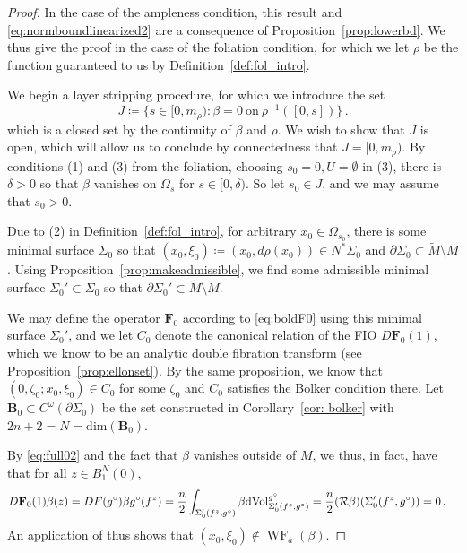 \documentclass[11pt]{amsart}
\DeclareMathOperator{\WF}{WF}
\theoremstyle{definition}
\numberwithin{equation}{section}
\newcommand{\p}{\partial}
\newcommand{\BB}{\mathbf B}
\begin{document}
\begin{proof}
In the case of the ampleness condition, this result and \eqref{eq:normboundlinearized2} are a consequence of Proposition~\ref{prop:lowerbd}. We thus give the proof in the case of the foliation condition, for which we let $\rho$ be the function guaranteed to us by Definition~\ref{def:fol_intro}. 

	We begin a layer stripping procedure, for which we introduce the set 
	\[
		J \coloneqq \{s\in [0,m_\rho)\colon \beta = 0\ \text{on}\ \rho^{-1}([0,s])\}\,.%
	\]
	which is a closed set by the continuity of $\beta$ and $\rho$. We wish to show that $J$ is open, which will allow us to conclude by connectedness that $J=[0,m_\rho)$. By conditions (1) and (3) from the foliation, choosing $s_0 = 0, U =\emptyset$ in (3), there is $\delta>0$ so that $\beta$ vanishes on $\Omega_s$ for $s\in [0,\delta)$. So let $s_0\in J$, and we may assume that $s_0>0$. 

	Due to (2) in Definition~\ref{def:fol_intro}, for arbitrary $x_0 \in \Omega_{s_0}$, there is some minimal surface $\Sigma_0$ so that $(x_0,\xi_0)\coloneqq (x_0,d\rho(x_0))\in N^\ast \Sigma_0$ and $\p\Sigma_0\subset \widetilde{M}\setminus M$. Using Proposition~\ref{prop:makeadmissible}, we find some admissible minimal surface $\Sigma_0'\subset \Sigma_0$ so that $\p\Sigma_0'\subset \widetilde{M}\setminus M$.
    
    We may define the operator $\mathbf{F}_0$ according to \eqref{eq:boldF0} using this minimal surface $\Sigma_0'$, and we let $C_0$ denote the canonical relation of the FIO $D\mathbf{F}_0(1)$, which we know to be an analytic double fibration transform (see Proposition~\ref{prop:ellonset}). By the same proposition, we know that $(0,\zeta_0;x_0,\xi_0)\in C_0$ for some $\zeta_0$ and $C_0$ satisfies the Bolker condition there. Let $\BB_0 \subset C^\omega(\partial\Sigma_0)$ be the set constructed in Corollary~\ref{cor: bolker} with $2n+2= N = \mathrm{dim}(\BB_0)$. %

    By \eqref{eq:full02} and the fact that $\beta$ vanishes outside of $M$, we thus, in fact, have that for all $z\in B_1^{N}(0)$,
	\begin{align*}
		D\mathbf{F}_0(1)\beta(z) &= DF(g^\circ)\beta g^\circ(f^z) = \frac{n}{2}\int_{\Sigma'_0(f^z,g^\circ)}\beta {\rm dVol}^{g^\circ}_{\Sigma'_0(f^z,g^\circ)} = \frac{n}{2}(\mathcal{R}\beta)(\Sigma_0'(f^z,g^\circ)) = 0\,.%
    	\end{align*}
    An application of \cite[Thm.~1.2]{MST} thus shows that $(x_0,\xi_0)\not\in \WF_a(\beta)$. 


\end{proof}
\end{document}
